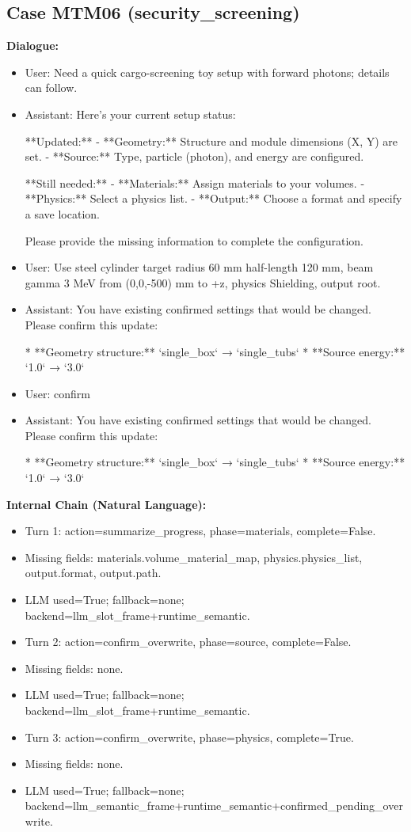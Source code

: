 \documentclass[11pt]{ctexart}
\begin{document}
\subsection{Case MTM06 (security\_screening)}
\textbf{Dialogue:}
\begin{itemize}
\item User: Need a quick cargo-screening toy setup with forward photons; details can follow.
\item Assistant: Here's your current setup status:

**Updated:**
- **Geometry:** Structure and module dimensions (X, Y) are set.
- **Source:** Type, particle (photon), and energy are configured.

**Still needed:**
- **Materials:** Assign materials to your volumes.
- **Physics:** Select a physics list.
- **Output:** Choose a format and specify a save location.

Please provide the missing information to complete the configuration.
\item User: Use steel cylinder target radius 60 mm half-length 120 mm, beam gamma 3 MeV from (0,0,-500) mm to +z, physics Shielding, output root.
\item Assistant: You have existing confirmed settings that would be changed. Please confirm this update:

*   **Geometry structure:** `single\_box` → `single\_tubs`
*   **Source energy:** `1.0` → `3.0`
\item User: confirm
\item Assistant: You have existing confirmed settings that would be changed. Please confirm this update:

*   **Geometry structure:** `single\_box` → `single\_tubs`
*   **Source energy:** `1.0` → `3.0`
\end{itemize}
\textbf{Internal Chain (Natural Language):}
\begin{itemize}
\item Turn 1: action=summarize\_progress, phase=materials, complete=False.
\item Missing fields: materials.volume\_material\_map, physics.physics\_list, output.format, output.path.
\item LLM used=True; fallback=none; backend=llm\_slot\_frame+runtime\_semantic.
\item Turn 2: action=confirm\_overwrite, phase=source, complete=False.
\item Missing fields: none.
\item LLM used=True; fallback=none; backend=llm\_slot\_frame+runtime\_semantic.
\item Turn 3: action=confirm\_overwrite, phase=physics, complete=True.
\item Missing fields: none.
\item LLM used=True; fallback=none; backend=llm\_semantic\_frame+runtime\_semantic+confirmed\_pending\_overwrite.
\end{itemize}
\end{document}
